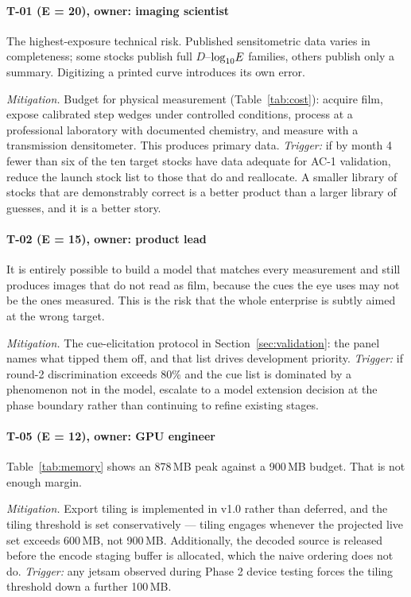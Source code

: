 \paragraph{T-01 (E = 20), owner: imaging scientist}
The highest-exposure technical risk. Published sensitometric data varies in
completeness; some stocks publish full $D$--$\log_{10}\!E$ families, others publish
only a summary. Digitizing a printed curve introduces its own error.

\emph{Mitigation.} Budget for physical measurement (Table~\ref{tab:cost}):
acquire film, expose calibrated step wedges under controlled conditions, process
at a professional laboratory with documented chemistry, and measure with a
transmission densitometer. This produces primary data. \emph{Trigger:} if by
month 4 fewer than six of the ten target stocks have data adequate for AC-1
validation, reduce the launch stock list to those that do and reallocate. A
smaller library of stocks that are demonstrably correct is a better product than
a larger library of guesses, and it is a better story.

\paragraph{T-02 (E = 15), owner: product lead}
It is entirely possible to build a model that matches every measurement and
still produces images that do not read as film, because the cues the eye uses may
not be the ones measured. This is the risk that the whole enterprise is
subtly aimed at the wrong target.

\emph{Mitigation.} The cue-elicitation protocol in
Section~\ref{sec:validation}: the panel names what tipped them off, and that list
drives development priority. \emph{Trigger:} if round-2 discrimination exceeds
80\% and the cue list is dominated by a phenomenon not in the model, escalate to
a model extension decision at the phase boundary rather than continuing to
refine existing stages.

\paragraph{T-05 (E = 12), owner: GPU engineer}
Table~\ref{tab:memory} shows an 878\,MB peak against a 900\,MB budget. That is
not enough margin.

\emph{Mitigation.} Export tiling is implemented in v1.0 rather than deferred,
and the tiling threshold is set conservatively --- tiling engages whenever the
projected live set exceeds 600\,MB, not 900\,MB. Additionally, the decoded
source is released before the encode staging buffer is allocated, which the
naive ordering does not do. \emph{Trigger:} any jetsam observed during Phase 2
device testing forces the tiling threshold down a further 100\,MB.

